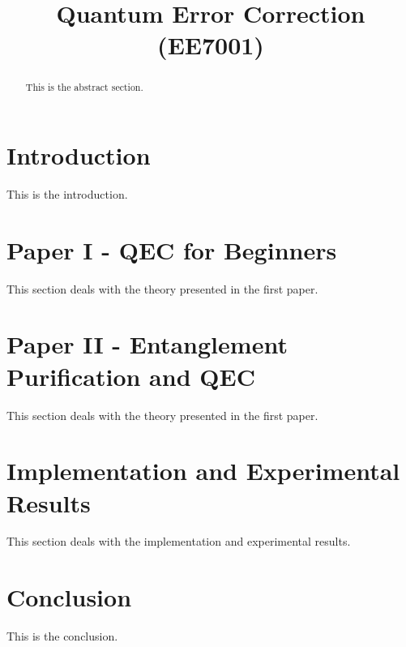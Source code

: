 \documentclass[conference]{IEEEtran}
\begin{document}
\title{Quantum Error Correction (EE7001)}

\author{
    \and
    \and
}

\maketitle

\begin{abstract}
This is the abstract section.
\end{abstract}

\section{Introduction}
This is \cite{sample2023} the introduction.

\section{Paper I - QEC for Beginners}
This section deals with the theory presented in the first paper\cite{paper1}.

\section{Paper II - Entanglement Purification and QEC}
This section deals with the theory presented in the first paper\cite{paper2}.


\section{Implementation and Experimental Results}
This section deals with the implementation and experimental results.

\section{Conclusion}
This is the conclusion.



\end{document}
